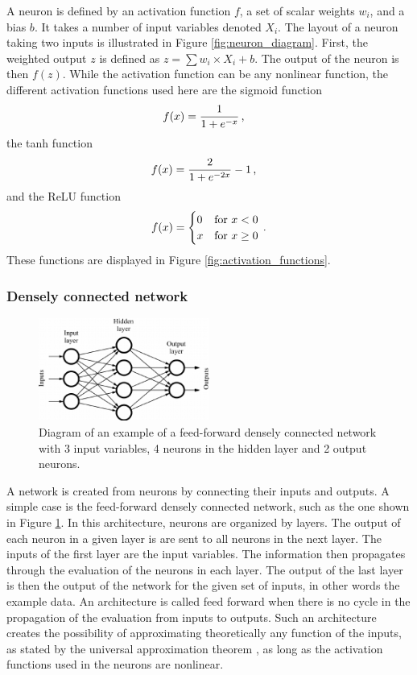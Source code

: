 A neuron is defined by an activation function $f$, a set of scalar weights $w_i$, and a bias $b$. It takes a number of input variables denoted $X_i$. The layout of a neuron taking two inputs is illustrated in Figure \ref{fig:neuron_diagram}. First, the weighted output $z$ is defined as $z = \sum w_i\times X_i + b$. The output of the neuron is then $f(z)$. While the activation function can be any nonlinear function, the different activation functions used here are the sigmoid function
\begin{equation}
    f(x) = \frac{1}{1+e^{-x}} \msep
\end{equation}
the tanh function
\begin{equation}
    f(x) = \frac{2}{1 + e^{-2x}} -1 \msep
\end{equation}
and the ReLU function
\begin{equation}
    f(x) = \begin{cases} 0 &\text{for $x < 0$} \\ x &\text{for $x \geq 0$} \end{cases} \mend
\end{equation}
These functions are displayed in Figure \ref{fig:activation_functions}.

\subsubsection{Densely connected network}


\begin{figure}
    \centering
    \includegraphics[width=0.5\textwidth]{Images/dense_network.png}
    \caption{Diagram of an example of a feed-forward densely connected network with 3 input variables, 4 neurons in the hidden layer and 2 output neurons.}
    \label{fig:dense_network}
\end{figure}

A network is created from neurons by connecting their inputs and outputs. A simple case is the feed-forward densely connected network, such as the one shown in Figure \ref{fig:dense_network}. In this architecture, neurons are organized by layers. The output of each neuron in a given layer is are sent to all neurons in the next layer. The inputs of the first layer are the input variables. The information then propagates through the evaluation of the neurons in each layer. The output of the last layer is then the output of the network for the given set of inputs, in other words the example data. An architecture is called feed forward when there is no cycle in the propagation of the evaluation from inputs to outputs. Such an architecture creates the possibility of approximating theoretically any function of the inputs, as stated by the universal approximation theorem \cite{Cybenko1989}, as long as the activation functions used in the neurons are nonlinear.

